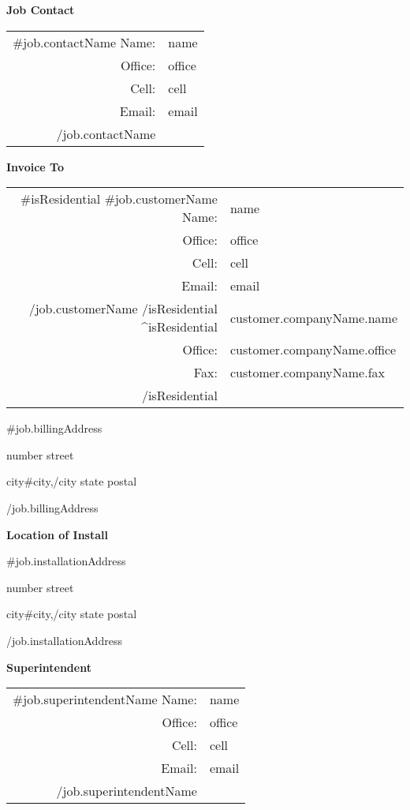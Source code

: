 \documentclass[11pt]{article}
\begin{document}

\ctaheader

\setlength{\columnseprule}{0.3pt}
\begin{multicols}{3}
  \centerline{\textbf{Job Contact}}
  \vspace{1em}
  \begin{tabularx}{0.9\linewidth}{rX}
  {{#job.contactName}}
    Name: & {{name}} \\
    Office: & {{office}} \\
    Cell: & {{cell}} \\
    Email: & {{email}} \\
  {{/job.contactName}}
  \\

  \end{tabularx}
  \vfill
  \columnbreak

  \centerline{\textbf{Invoice To}}
  \vspace{1em}
  \begin{tabularx}{0.9\linewidth}{rX}
    {{#isResidential}}
      {{#job.customerName}}
        Name: & {{name}} \\
        Office: & {{office}} \\
        Cell: & {{cell}} \\
        Email: & {{email}} \\
      {{/job.customerName}}
    {{/isResidential}}
    {{^isResidential}}
      & {{customer.companyName.name}} \\
      Office: & {{customer.companyName.office}} \\
      Fax: & {{customer.companyName.fax}} \\
    {{/isResidential}}
  \end{tabularx}

  \vspace{1em}
  {{#job.billingAddress}}
  \centerline{ {{number}} {{street}} }
  \centerline{ {{city}}{{#city}},{{/city}} {{state}} {{postal}} }
  {{/job.billingAddress}}
  \vfill
  \columnbreak

  \centerline{\textbf{Location of Install}}
  \vspace{1em}
  {{#job.installationAddress}}
  \centerline{ {{number}} {{street}} }
  \centerline{ {{city}}{{#city}},{{/city}} {{state}} {{postal}} }
  {{/job.installationAddress}}
  \vspace{1em}

  \centerline{\textbf{Superintendent}}
  \begin{tabularx}{0.9\linewidth}{rX}
  {{#job.superintendentName}}
    Name: & {{name}} \\
    Office: & {{office}} \\
    Cell: & {{cell}} \\
    Email: & {{email}} \\
  {{/job.superintendentName}}
  \end{tabularx}
  \vfill
\end{multicols}
\end{document}
